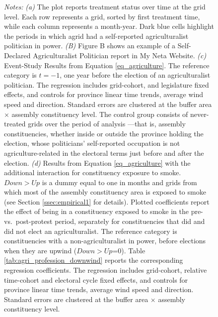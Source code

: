 \documentclass[12pt]{article}
\begin{document}
\begin{figure}[hbtp!]
    
    \begin{minipage}{\textwidth}
        {\small \textit{Notes: }\textit{(a)} 
        The plot reports treatment status over time at the grid level. Each row represents a grid, sorted by first treatment time, while each column represents a month-year. Dark blue cells highlight the periods in which agrid had a self-reported agriculturalist politician in power.
        \textit{(B)} Figure B shows an example of a Self-Declared Agriculturalist Politician report in My Neta Website.  
        \textit{(c)} Event-Study Results from Equation \ref{eq_agriculture}. %
        The reference category is $t=-1$, one year before the election of an agriculturalist politician. 
        The regression includes grid-cohort, and legislature fixed effects, and controls for province linear time trends, average wind speed and direction. Standard errors are clustered at the buffer area $\times$ assembly constituency level. The control group consists of never-treated grids over the period of analysis ---that is, assembly constituencies, whether inside or outside the province holding the election, whose politicians' self-reported occupation is not agriculture-related in the electoral terms just before and after the election. 
        \textit{(d)} Results from Equation \ref{eq_agriculture} with the additional interaction for constituency exposure to smoke. $Down>Up$ is a dummy equal to one in months and grids from which most of the assembly constituency area is exposed to smoke (see Section \ref{ssec:empirical1} for details).
        Plotted coefficients report the effect of being in a constituency exposed to smoke in the pre- vs.\ post-protest period, separately for constituencies that did and did not elect an agriculturalist. The reference category is constituencies with a non-agriculturalist in power, before elections when they are upwind ($Down>Up$=0).
        Table \ref{tab:agri_profession_downwind} reports the corresponding regression coefficients.
        The regression includes grid-cohort, relative time-cohort and electoral cycle fixed effects, and controls for province linear time trends, average wind speed and direction. Standard errors are clustered at the buffer area $\times$ assembly constituency level.
        }
    \end{minipage}
\end{figure}
\end{document}
